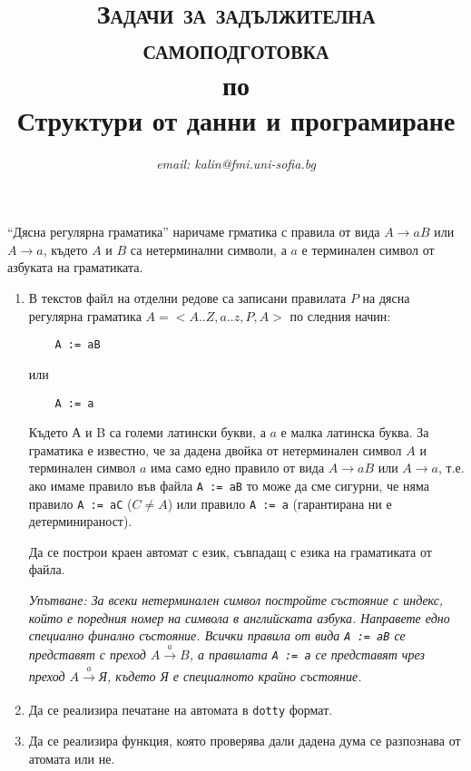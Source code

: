\documentclass[12pt,a4paper]{article}
\author{\textit{email: kalin@fmi.uni-sofia.bg}}
\title{\textsc{Задачи за задължителна самоподготовка} \\
по \\
Структури от данни и програмиране}
\begin{document}
\maketitle


``Дясна регулярна граматика'' наричаме грматика с правила от вида $A \rightarrow aB$ или $A \rightarrow a$, където $A$ и $B$ са нетерминални символи, а $a$ е терминален символ от азбуката на граматиката.



\begin{enumerate}


	\item В текстов файл на отделни редове са записани правилата $P$ на дясна регулярна граматика $A=<A..Z,a..z,P,A>$ по следния начин:
	\begin{verbatim}
	A := aB
	\end{verbatim}

	или

	\begin{verbatim}
	A := a
	\end{verbatim}

	Където А и B са големи латински букви, а $a$ е малка латинска буква. За граматика е известно, че за дадена двойка от нетерминален символ $A$ и терминален символ $a$ има само едно правило от вида $A \rightarrow aB$ или $A \rightarrow a$, т.е. ако имаме правило във файла \texttt{A := aB} то може да сме сигурни, че няма правило \texttt{A := aC} ($C \neq A$) или правило \texttt{A := a} (гарантирана ни е детерминираност).

	Да се построи краен автомат с език, съвпадащ с езика на граматиката от файла.

	\emph{Упътване: За всеки нетерминален символ постройте състояние с индекс, който е поредния номер на символа в английската азбука. Направете едно специално финално състояние. Всички правила от вида \texttt{A := aB} се представят с преход $A \xrightarrow[]{a}B$, а правилата \texttt{A := a} се представят чрез преход $A \xrightarrow[]{a}$Я, където Я е специалното крайно състояние.}

	\item Да се реализира печатане на автомата в \texttt{dotty} формат.

	\item Да се реализира функция, която проверява дали дадена дума се разпознава от атомата или не.


\end{enumerate}
\end{document}
